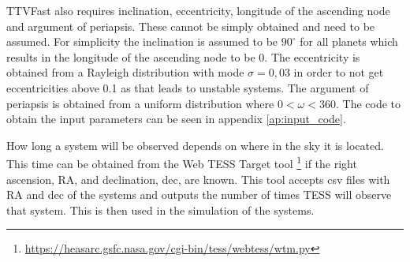 \documentclass[12pt]{report}
\begin{document}
	TTVFast also requires inclination, eccentricity, longitude of the ascending node and argument of periapsis. These cannot be simply obtained and need to be assumed. For simplicity the inclination is assumed to be $90^{\circ}$ for all planets which results in the longitude of the ascending node to be 0. The eccentricity is obtained from a Rayleigh distribution with mode $\sigma = 0,03$ in order to not get eccentricities above 0.1 as that leads to unstable systems. The argument of periapsis is obtained from a uniform distribution where $0 < \omega < 360$. The code to obtain the input parameters can be seen in appendix \ref{ap:input_code}. 
	
	How long a system will be observed depends on where in the sky it is located. This time can be obtained from the Web TESS Target tool \footnote{\url{https://heasarc.gsfc.nasa.gov/cgi-bin/tess/webtess/wtm.py}} if the right ascension, RA, and declination, dec, are known. This tool accepts csv files with RA and dec of the systems and outputs the number of times TESS will observe that system. This is then used in the simulation of the systems.
	
\end{document}
